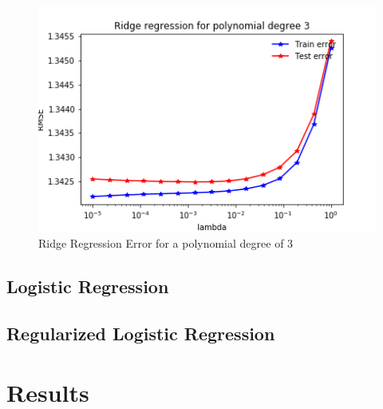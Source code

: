 \documentclass[10pt,conference,compsocconf]{IEEEtran}
\begin{document}
\begin{figure}[hbp]
  \centering
  \includegraphics[width=\columnwidth]{ridge_regression.png}
  \caption{Ridge Regression Error for a polynomial degree of 3}
  \vspace{-3mm}
  \label{fig:ridge}
\end{figure}

\subsection{Logistic Regression}

\subsection{Regularized Logistic Regression}

\section{Results}



\end{document}
